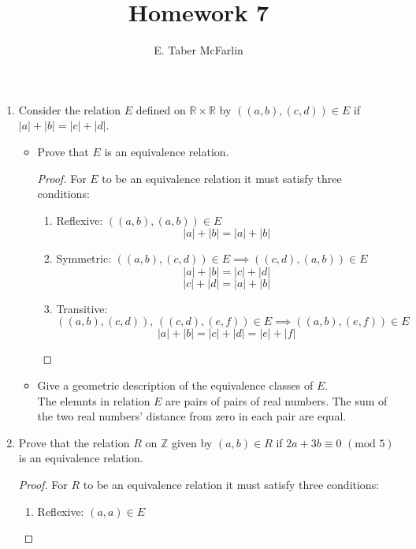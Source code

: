 \documentclass[12pt,a4paper,reqno,parskip=full]{amsart}
\numberwithin{equation}{section}
\theoremstyle{plain}
\theoremstyle{definition}
\begin{document}
\title{Homework 7}

\author{E. Taber McFarlin}

\maketitle

\begin{enumerate}
  \item Consider the relation $E$ defined on $\mathbb{R} \times\mathbb{R}$ by
        $\left((a,b),(c,d)\right)\in E$ if $|a|+|b| = |c|+|d|$.
        \begin{itemize}
          \item Prove that $E$ is an equivalence relation.
                \begin{proof}
                  For $E$ to be an equivalence relation it must satisfy three conditions:
                  \begin{enumerate}[i]
                    \item Reflexive: $((a,b), (a,b))\in E$
                          \[|a| + |b| = |a| + |b|\]
                    \item Symmetric: $((a,b), (c,d))\in E \implies ((c,d), (a,b))\in E$
                          \[|a| + |b| = |c| + |d|\]
                          \[|c| + |d| = |a| + |b|\]
                    \item Transitive:
                          $((a,b), (c,d)),\,((c,d), (e,f))\in E \implies ((a,b), (e,f))\in E$
                          \[|a| + |b| = |c| + |d| = |e| + |f|\]
                  \end{enumerate}
                \end{proof}
          \item Give a geometric description of the equivalence classes of $E$. \\
                The elemnts in relation $E$ are pairs of pairs of real numbers. The sum of the
                two real numbers' distance from zero in each pair are equal.
        \end{itemize}
  \item Prove that the relation $R$ on $\mathbb{Z}$ given by
        $(a,b)\in R$ if $2a+3b\equiv0\,\,(\text{mod}\,\,5)$ is an equivalence relation.
        \begin{proof}
          For $R$ to be an equivalence relation it must satisfy three conditions:
          \begin{enumerate}[i]
            \item Reflexive: $(a,a)\in E$

\end{enumerate}
\end{proof}
\end{enumerate}
\end{document}
